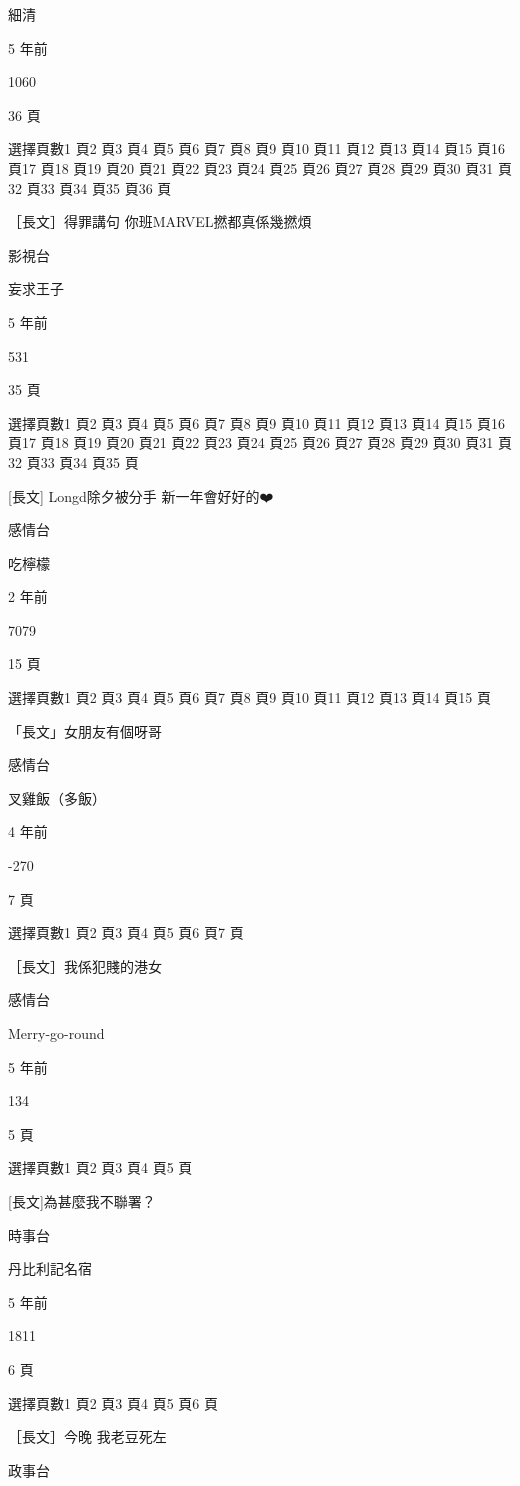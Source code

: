 細清

5 年前

1060

36 頁

選擇頁數1 頁2 頁3 頁4 頁5 頁6 頁7 頁8 頁9 頁10 頁11 頁12 頁13 頁14 頁15 頁16 頁17 頁18 頁19 頁20 頁21 頁22 頁23 頁24 頁25 頁26 頁27 頁28 頁29 頁30 頁31 頁32 頁33 頁34 頁35 頁36 頁

［長文］得罪講句 你班MARVEL撚都真係幾撚煩

影視台

妄求王子

5 年前

531

35 頁

選擇頁數1 頁2 頁3 頁4 頁5 頁6 頁7 頁8 頁9 頁10 頁11 頁12 頁13 頁14 頁15 頁16 頁17 頁18 頁19 頁20 頁21 頁22 頁23 頁24 頁25 頁26 頁27 頁28 頁29 頁30 頁31 頁32 頁33 頁34 頁35 頁

[長文] Longd除夕被分手 新一年會好好的❤️

感情台

吃檸檬

2 年前

7079

15 頁

選擇頁數1 頁2 頁3 頁4 頁5 頁6 頁7 頁8 頁9 頁10 頁11 頁12 頁13 頁14 頁15 頁

「長文」女朋友有個呀哥

感情台

叉雞飯（多飯）

4 年前

-270

7 頁

選擇頁數1 頁2 頁3 頁4 頁5 頁6 頁7 頁

［長文］我係犯賤的港女

感情台

Merry-go-round

5 年前

134

5 頁

選擇頁數1 頁2 頁3 頁4 頁5 頁

[長文]為甚麼我不聯署？

時事台

丹比利記名宿

5 年前

1811

6 頁

選擇頁數1 頁2 頁3 頁4 頁5 頁6 頁

［長文］今晚 我老豆死左

政事台


